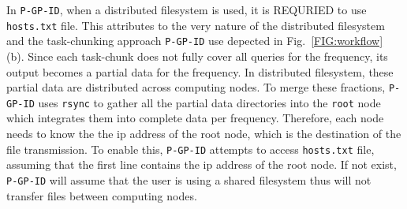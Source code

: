 In \texttt{P-GP-ID}, when a distributed filesystem is used, it is REQURIED to use \texttt{hosts.txt} file. This attributes to the very nature of the distributed filesystem and the task-chunking approach \texttt{P-GP-ID} use depected in Fig.~\ref{FIG:workflow} (b). Since each task-chunk does not fully cover all queries for the frequency, its output becomes a partial data for the frequency. In distributed filesystem, these partial data are distributed across computing nodes. To merge these fractions, \texttt{P-GP-ID} uses \texttt{rsync} to gather all the partial data directories into the \texttt{root} node which integrates them into complete data per frequency. Therefore, each node needs to know the the ip address of the root node, which is the destination of the file transmission. To enable this, \texttt{P-GP-ID} attempts to access \texttt{hosts.txt} file, assuming that the first line contains the ip address of the root node. If not exist, \texttt{P-GP-ID} will assume that the user is using a shared filesystem thus will not transfer files between computing nodes.